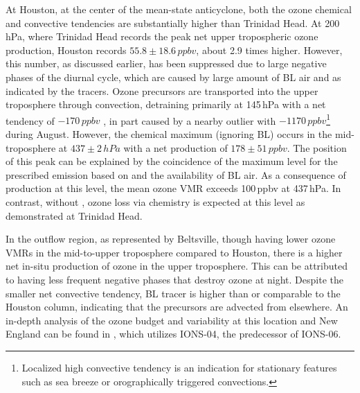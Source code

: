 At Houston, at the center of the mean-state anticyclone, both the ozone chemical and convective tendencies are substantially higher than Trinidad Head.
At 200\,\unit{hPa}, where Trinidad Head records the peak net upper tropospheric ozone production, Houston records $55.8\pm18.6\,\unit{ppbv}$, about
2.9 times higher. However, this number, as discussed earlier, has been suppressed due to large negative phases of the diurnal cycle, which are caused by
large amount of BL air and {\lnox} as indicated by the tracers. Ozone precursors are transported into the upper troposphere through
convection, detraining primarily at 145\,\unit{hPa} with a net tendency of $-170\,\unit{ppbv}$ , in part
caused by a nearby outlier with $-1170\,\unit{ppbv}$\footnote{Localized high convective tendency is an indication for stationary features such as sea
breeze or orographically triggered convections.} during August. However, the chemical maximum (ignoring BL) occurs in the mid-troposphere at
$437\pm2\,\unit{hPa}$ with a net production of $178\pm51\,\unit{ppbv}$. The position of this peak can be explained by the coincidence of the maximum
level for the prescribed {\lnox} emission based on \citet{Ott:2010lo} and the availability of BL air. As a consequence of production at this level, the mean
ozone VMR exceeds 100\,\unit{ppbv} at 437\,\unit{hPa}. In contrast, without {\lnox}, ozone loss via chemistry is expected at this level as
demonstrated at Trinidad Head.

In the outflow region, as represented by Beltsville, though having lower ozone VMRs in the mid-to-upper troposphere compared to Houston, there is a higher net in-situ production of
ozone in the upper troposphere. This can be attributed to having less frequent negative phases that destroy ozone at night. Despite the smaller net
convective tendency, BL tracer is higher than or comparable to the Houston column, indicating that the precursors are advected from elsewhere. An
in-depth analysis of the ozone budget and variability at this location and New England can be found in \citet{Thompson:2007gd,Thompson:2007ov}, which 
utilizes IONS-04, the predecessor of IONS-06.

